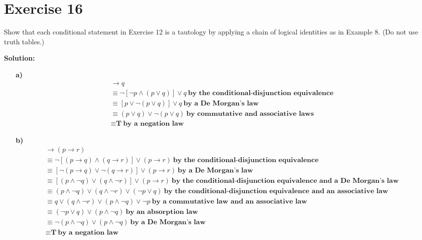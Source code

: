 \documentclass{Axon}
\begin{document}
\section*{Exercise 16}
Show that each conditional statement in Exercise 12 is a tautology by applying a chain of logical identities as in Example 8. (Do not use truth tables.)

\noindent
\textbf{Solution:}
\begin{enumerate}
    \item[\textbf{a)}]
    \begin{gather*}
        [\lnot p \land (p \lor q)] \to q \\
        \equiv \lnot [\lnot p \land (p \lor q)] \lor q \ \textbf{by the conditional-disjunction equivalence} \\
        \equiv [p \lor \lnot(p \lor q)] \lor q \ \textbf{by a De Morgan's law} \\
        \equiv (p \lor q) \lor \lnot(p \lor q) \ \textbf{by commutative and associative laws} \\
        \equiv \textbf{T} \ \textbf{by a negation law}
    \end{gather*}
    
    \item[\textbf{b)}]
    \begin{gather*}
        [(p \to q) \land (q \to r)] \to (p \to r) \\
        \equiv \lnot[(p \to q) \land (q \to r)] \lor (p \to r) \ \textbf{by the conditional-disjunction equivalence} \\
        \equiv [\lnot(p \to q) \lor \lnot(q \to r)] \lor (p \to r) \ \textbf{by a De Morgan's law} \\
        \equiv [(p \land \lnot q) \lor (q \land \lnot r)] \lor (p \to r) \ \textbf{by the conditional-disjunction equivalence and a De Morgan's law} \\
        \equiv (p \land \lnot q) \lor (q \land \lnot r) \lor (\lnot p \lor q) \ \textbf{by the conditional-disjunction equivalence and an associative law} \\
        \equiv q \lor (q \land \lnot r) \lor (p \land \lnot q) \lor \lnot p \ \textbf{by a commutative law and an associative law} \\
        \equiv (\lnot p \lor q) \lor (p \land \lnot q) \ \textbf{by an absorption law} \\
        \equiv \lnot(p \land \lnot q) \lor (p \land \lnot q) \ \textbf{by a De Morgan's law} \\
        \equiv \textbf{T} \ \textbf{by a negation law}
    \end{gather*}
    

\end{enumerate}
\end{document}
